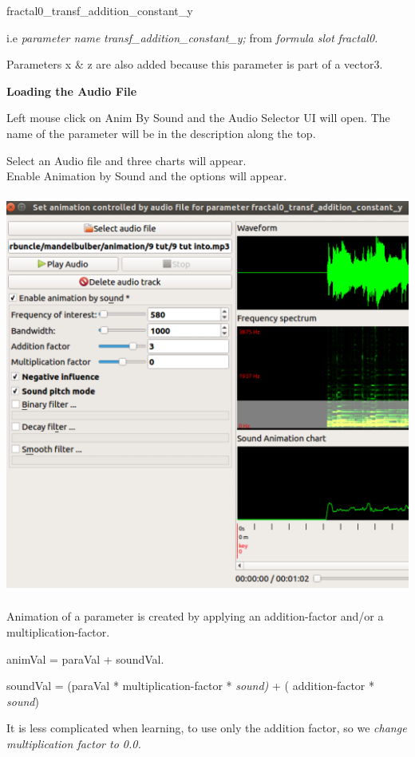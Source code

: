 fractal0\_transf\_addition\_constant\_y

i.e \emph{parameter name} \emph{transf\_addition\_constant\_y;} from
\emph{formula slot} \emph{fractal0.}

Parameters x \& z are also added because this parameter is part of a
vector3.

\textbf{Loading the Audio File}

Left mouse click on Anim By Sound and the Audio Selector UI will open.
The name of the parameter will be in the description along the top.

Select an Audio file and three charts will
appear.\\[2\baselineskip]Enable Animation by Sound and the options will
appear.

\includegraphics[width=5.41654in,height=5.20827in]{img/sound/media/image4.png}

Animation of a parameter is created by applying an addition-factor
and/or a multiplication-factor.

animVal = paraVal + soundVal.

soundVal = (paraVal * multiplication-factor * \emph{sound)} + (
addition-factor * \emph{sound})

It is less complicated when learning, to use only the addition factor,
so we \emph{change multiplication factor to 0.0.}

